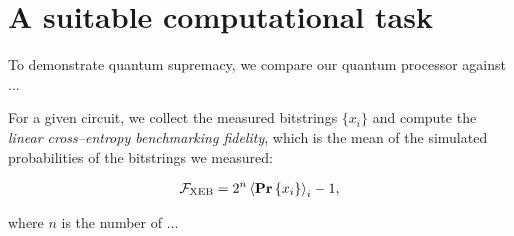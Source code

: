 \section{A suitable computational task}
\label{sec:task}
To demonstrate quantum supremacy, we compare our quantum processor against ...

%
%
%
For a given circuit, we collect the measured bitstrings $\{x_{i}\}$ and compute
the \textit{linear cross--entropy benchmarking fidelity}, which is the mean of
the simulated probabilities of the bitstrings we measured:

%
%
%
\begin{equation}
  \begin{split}
    \mathcal{F}_{\text{XEB}} &= 2^{n} \braket{\Prob{x_{i}}}_{i} - 1, \\
  \end{split}
  \label{eq:fidelity}
\end{equation}

where $n$ is the number of ...
